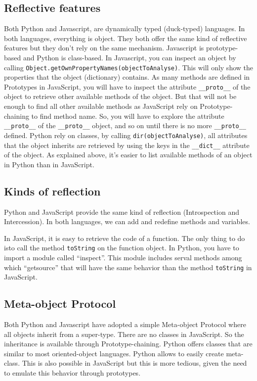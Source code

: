\documentclass[a4paper,10pt]{article}
\begin{document}
\subsection{Reflective features}

Both Python and Javascript, are dynamically typed (duck-typed) languages.
In both languages, everything is object.
They both offer the same kind of reflective features but they don't rely on the same mechanism.
Javascript is prototype-based and Python is class-based.
In Javascript, you can inspect an object by calling \setjs \mbox{\lstinline|Object.getOwnPropertyNames(objectToAnalyse)|}.
This will only show the properties that the object (dictionary) contains.
As many methods are defined in Prototypes in JavaScript, you will have to inspect the attribute \lstinline|__proto__| of the object to retrieve other available methods of the object.
But that will not be enough to find all other available methods as JavaScript rely on Prototype-chaining to find method name.
So, you will have to explore the attribute \lstinline|__proto__| of the \lstinline|__proto__| object, and so on until there is no more \lstinline|__proto__| defined.
\setpy
Python rely on classes, by calling \lstinline|dir(objectToAnalyse)|, all attributes that the object inherits are retrieved by using the keys in the \lstinline|__dict__| attribute of the object. As explained above, it's easier to list available methods of an object in Python than in JavaScript.

\subsection{Kinds of reflection}

Python and JavaScript provide the same kind of reflection (Introspection and Intercession). In both languages, we can add and redefine methods and variables.

In JavaScript, it is easy to retrieve the code of a function. The only thing to do isto call the method \lstinline|toString| on the function object. In Python, you have to import a module called ``inspect''. This module includes serval methods among which ``getsource'' that will have the same behavior than the method \lstinline|toString| in JavaScript. 

\subsection{Meta-object Protocol}

Both Python and Javascript have adopted a simple Meta-object Protocol where all objects inherit from a super-type. There are no classes in JavaScript. So the inheritance is available through Prototype-chaining. Python offers classes that are similar to most oriented-object languages. Python allows to easily create meta-class. This is also possible in JavaScript but this is more tedious, given the need to emulate this behavior through prototypes.
\end{document}
